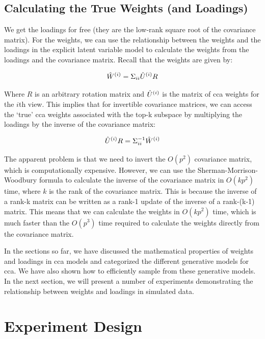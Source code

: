 \subsection{Calculating the True Weights (and Loadings)}
We get the loadings for free (they are the low-rank square root of the covariance matrix).
For the weights, we can use the relationship between the weights and the loadings in the explicit latent variable model to calculate the weights from the loadings and the covariance matrix.
Recall that the weights are given by:

\begin{align}
    \hat{W}^{(i)} = \Sigma_{ii} \hat{U}^{(i)} R
\end{align}

Where $R$ is an arbitrary rotation matrix and $\hat{U}^{(i)}$ is the matrix of \acrshort{cca} weights for the $i$th view.
This implies that for invertible covariance matrices, we can access the `true' \acrshort{cca} weights associated with the top-k subspace by multiplying the \gls{loadings} by the inverse of the covariance matrix:

\begin{align}
    \hat{U}^{(i)}R = \Sigma_{ii}^{-1} \hat{W}^{(i)}
\end{align}

The apparent problem is that we need to invert the \(O(p^2)\) covariance matrix, which is computationally expensive.
However, we can use the Sherman-Morrison-Woodbury formula to calculate the inverse of the covariance matrix in \(O(kp^2)\) time, where \(k\) is the rank of the covariance matrix.
This is because the inverse of a rank-k matrix can be written as a rank-1 update of the inverse of a rank-(k-1) matrix.
This means that we can calculate the weights in \(O(kp^2)\) time, which is much faster than the \(O(p^3)\) time required to calculate the weights directly from the covariance matrix.

In the sections so far, we have discussed the mathematical properties of weights and \gls{loadings} in \acrshort{cca} models and categorized the different generative models for \acrshort{cca}.
We have also shown how to efficiently sample from these generative models.
In the next section, we will present a number of experiments demonstrating the relationship between weights and \gls{loadings} in simulated data.

\section{Experiment Design}

